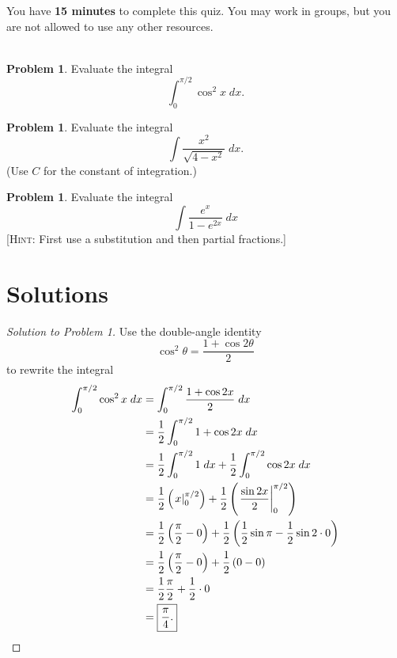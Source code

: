 \documentclass[12pt]{article}
\theoremstyle{plain}
\theoremstyle{definition}
\newtheorem{problem}[exercise]{Problem}
\theoremstyle{remark}
\begin{document}
\author{TA: \href{mailto:\authoremail}{\documentauthor}}
\title{\documenttitle}
\date{\today}
\maketitle

You have \textbf{15 minutes} to complete this quiz. You may work in groups,
but you are not allowed to use any other resources.
\\\\
\begin{problem}
Evaluate the integral
\[
\int_0^{\pi/2}\cos^2x\;dx.
\]
\end{problem}
\bigskip
\begin{problem}
Evaluate the integral
\[
\int\frac{x^2}{\sqrt{4-x^2}}\;dx.
\]
(Use $C$ for the constant of integration.)
\end{problem}
\bigskip
\begin{problem}
Evaluate the integral
\[
\int\frac{e^x}{1-e^{2x}}\;dx
\]
[\textsc{Hint:} First use a substitution and then partial fractions.]
\end{problem}
\newpage
\section*{Solutions}
\begin{proof}[Solution to Problem 1]
Use the double-angle identity
\begin{equation}
\label{eq:cos-double-angle}
\cos^2\theta=\frac{1+\cos2\theta}{2}
\end{equation}
to rewrite the integral
\begin{align*}
\int_0^{\pi/2}\cos^2 x\;dx
&=\int_0^{\pi/2}\frac{1+\cos2x}{2}\;dx\\
&=\frac{1}{2}\int_0^{\pi/2}1+\cos2x\;dx\\
&=\frac{1}{2}\int_0^{\pi/2}1\;dx+\frac{1}{2}\int_0^{\pi/2}\cos 2x\;dx\\
&=\frac{1}{2}\left(\left.x\right|_0^{\pi/2}\right)
+\frac{1}{2}\left(\left.\frac{\sin 2x}{2}\right|_0^{\pi/2}\right)\\
&=\frac{1}{2}\left(\frac{\pi}{2}-0\right)+\frac{1}{2}\left(\frac{1}{2}\sin
  \pi-\frac{1}{2}\sin 2\cdot 0\right)\\
&=\frac{1}{2}\left(\frac{\pi}{2}-0\right)+\frac{1}{2}\left(0-0\right)\\
&=\frac{1}{2}\frac{\pi}{2}+\frac{1}{2}\cdot 0\\
&=\boxed{\frac{\pi}{4}.}\qedhere
\end{align*}
\end{proof}
\end{document}
